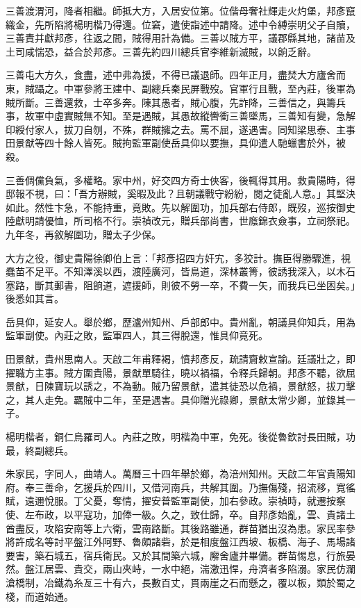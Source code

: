 \begin{pinyinscope}
{{三善渡渭河，降者相繼。師抵大方，入居安位第。位偕母奢社輝走火灼堡，邦彥竄織金，先所陷將楊明楷乃得還。位窘，遣使詣述中請降。述中令縛崇明父子自贖，三善責并獻邦彥，往返之間，賊得用計為備。三善以賊方平，議郡縣其地，諸苗及土司咸惴恐，益合於邦彥。三善先約四川總兵官李維新滅賊，以餉乏辭。

三善屯大方久，食盡，述中弗為援，不得已議退師。四年正月，盡焚大方廬舍而東，賊躡之。中軍參將王建中、副總兵秦民屏戰歿。官軍行且戰，至內莊，後軍為賊所斷。三善還救，士卒多奔。陳其愚者，賊心腹，先詐降，三善信之，與籌兵事，故軍中虛實賊無不知。至是遇賊，其愚故縱轡衝三善墜馬，三善知有變，急解印綬付家人，拔刀自刎，不殊，群賊擁之去。罵不屈，遂遇害。同知梁思泰、主事田景猷等四十餘人皆死。賊拘監軍副使岳具仰以要撫，具仰遣人馳蠟書於外，被殺。

三善倜儻負氣，多權略。家中州，好交四方奇士俠客，後輒得其用。救貴陽時，得邸報不視，曰：「吾方辦賊，奚暇及此？且朝議戰守紛紛，閱之徒亂人意。」其堅決如此。然性卞急，不能持重，竟敗。先以解圍功，加兵部右侍郎，既歿，巡按御史陸獻明請優恤，所司格不行。崇禎改元，贈兵部尚書，世廕錦衣僉事，立祠祭祀。九年冬，再敘解圍功，贈太子少保。

大方之役，御史貴陽徐卿伯上言：「邦彥招四方奸宄，多狡計。撫臣得勝驟進，視蠢苗不足平。不知澤溪以西，渡陸廣河，皆鳥道，深林叢箐，彼誘我深入，以木石塞路，斷其郵書，阻餉道，遮援師，則彼不勞一卒，不費一矢，而我兵已坐困矣。」後悉如其言。

岳具仰，延安人。舉於鄉，歷瀘州知州、戶部郎中。貴州亂，朝議具仰知兵，用為監軍副使。內莊之敗，監軍四人，其三得脫還，惟具仰竟死。

田景猷，貴州思南人。天啟二年甫釋褐，憤邦彥反，疏請齎敕宣諭。廷議壯之，即擢職方主事。賊方圍貴陽，景猷單騎往，曉以禍福，令釋兵歸朝。邦彥不聽，欲屈景猷，日陳寶玩以誘之，不為動。賊乃留景猷，遣其徒恐以危禍，景猷怒，拔刀擊之，其人走免。羈賊中二年，至是遇害。具仰贈光祿卿，景猷太常少卿，並錄其一子。

楊明楷者，銅仁烏羅司人。內莊之敗，明楷為中軍，免死。後從魯欽討長田賊，功最，終副總兵。

朱家民，字同人，曲靖人。萬曆三十四年舉於鄉，為涪州知州。天啟二年官貴陽知府。奉三善命，乞援兵於四川，又借河南兵，共解其圍。乃撫傷殘，招流移，寬徭賦，遠邇悅服。丁父憂，奪情，擢安普監軍副使，加右參政。崇禎時，就遷按察使、左布政，以平寇功，加俸一級。久之，致仕歸，卒。自邦彥始亂，雲、貴諸土酋盡反，攻陷安南等上六衛，雲南路斷。其後路雖通，群苗猶出沒為患。家民率參將許成名等討平盤江外阿野、魯頗諸砦，於是相度盤江西坡、板橋、海子、馬場諸要害，築石城五，宿兵衛民。又於其間築六城，廨舍廬井畢備。群苗惕息，行旅晏然。盤江居雲、貴交，兩山夾峙，一水中絕，湍激迅悍，舟濟者多陷溺。家民仿瀾滄橋制，冶鐵為糸亙三十有六，長數百丈，貫兩崖之石而懸之，覆以板，類於蜀之棧，而道始通。

}}
\end{pinyinscope}
